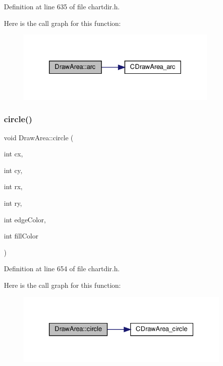 Definition at line 635 of file chartdir.\+h.

Here is the call graph for this function\+:
\nopagebreak
\begin{figure}[H]
\begin{center}
\leavevmode
\includegraphics[width=282pt]{class_draw_area_ab04d989712f8d711d0b0870d5ea82181_cgraph}
\end{center}
\end{figure}
\mbox{\label{class_draw_area_af4cb297e36cbb745413a2f0043f7ceeb}} 
\subsubsection{\texorpdfstring{circle()}{circle()}}
{\footnotesize\ttfamily void Draw\+Area\+::circle (\begin{DoxyParamCaption}\item[{int}]{cx,  }\item[{int}]{cy,  }\item[{int}]{rx,  }\item[{int}]{ry,  }\item[{int}]{edge\+Color,  }\item[{int}]{fill\+Color }\end{DoxyParamCaption})\hspace{0.3cm}{\ttfamily [inline]}}



Definition at line 654 of file chartdir.\+h.

Here is the call graph for this function\+:
\nopagebreak
\begin{figure}[H]
\begin{center}
\leavevmode
\includegraphics[width=301pt]{class_draw_area_af4cb297e36cbb745413a2f0043f7ceeb_cgraph}
\end{center}
\end{figure}
\mbox{\label{class_draw_area_af2045d87f9eecf5b6649361cf1598ae3}} 
